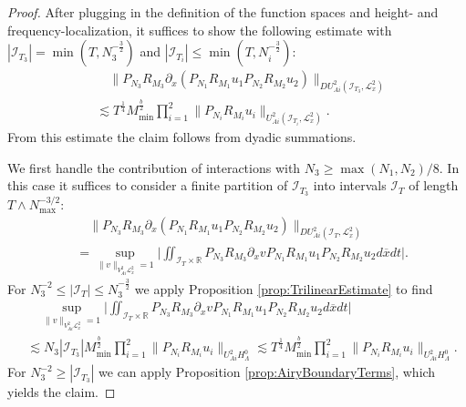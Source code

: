 \documentclass{amsart}
\theoremstyle{definition}
\newcommand{\R}{\mathbb{R}}
\begin{document}
\begin{proof}
After plugging in the definition of the function spaces and height- and frequency-localization, it suffices to show the following estimate with \\ $|\mathcal{I}_{T_3}| = \min( T , N_3^{-\frac{3}{2}})$ and $|\mathcal{I}_{T_i}| \leq \min(T,N_i^{-\frac{3}{2}})$:
\begin{equation}
\label{eq:LocalizedNonlinearEstimate}
\begin{split}
&\quad \| P_{N_3} R_{M_3} \partial_x (P_{N_1} R_{M_1} u_1 P_{N_2} R_{M_2} u_2) \|_{DU_{Ai}^2(\mathcal{I}_{T_3}, \mathcal{L}^2_x)} \\
&\lesssim T^{\frac{1}{4}} M_{\min}^{\frac{b}{2}} \prod_{i=1}^2 \| P_{N_i} R_{M_i} u_i \|_{U^2_{Ai}(\mathcal{I}_{T_i}, \mathcal{L}^2_x)}.
\end{split}
\end{equation}
From this estimate the claim follows from dyadic summations.

We first handle the contribution of interactions with $N_3 \geq \max(N_1,N_2)/8$. In this case it suffices to consider a finite partition of $\mathcal{I}_{T_3}$ into intervals $\mathcal{I}_T$ of length $T \wedge N^{-3/2}_{\max}$:
\begin{equation*}
\begin{split}
&\quad \| P_{N_3} R_{M_3} \partial_x (P_{N_1} R_{M_1} u_1 P_{N_2} R_{M_2} u_2) \|_{DU^2_{Ai}(\mathcal{I}_{T},\mathcal{L}^2_x)} \\
 &= \sup_{\| v \|_{V^2_{Ai} \mathcal{L}^2_x} = 1} \big| \iint_{\mathcal{I}_{T} \times \R} P_{N_3} R_{M_3} \partial_x v P_{N_1} R_{M_1} u_1 P_{N_2} R_{M_2} u_2 d\overline{x} dt \big|.
\end{split}
\end{equation*}
For $N_3^{-2} \leq |\mathcal{I}_T| \leq N_3^{-\frac{3}{2}}$ we apply Proposition \ref{prop:TrilinearEstimate} to find 
\begin{equation*}
\begin{split}
&\quad \sup_{\| v \|_{V^2_{Ai} \mathcal{L}^2_x} = 1} \big| \iint_{\mathcal{I}_{T} \times \R} P_{N_3} R_{M_3} \partial_x v P_{N_1} R_{M_1} u_1 P_{N_2} R_{M_2} u_2 d\overline{x} dt \big| \\
&\lesssim N_3 |\mathcal{I}_{T_3}| M_{\min}^{\frac{b}{2}} \prod_{i=1}^2 \| P_{N_i} R_{M_i} u_i \|_{U^2_{Ai} H^0_\Lambda} \lesssim T^{\frac{1}{4}} M_{\min}^{\frac{b}{2}} \prod_{i=1}^2 \| P_{N_i} R_{M_i} u_i \|_{U^2_{Ai} H^0_\Lambda}.
\end{split}
\end{equation*}
For $N_3^{-2} \geq |\mathcal{I}_{T_3}|$ we can apply Proposition \ref{prop:AiryBoundaryTerms}, which yields the claim.


\end{proof}
\end{document}
